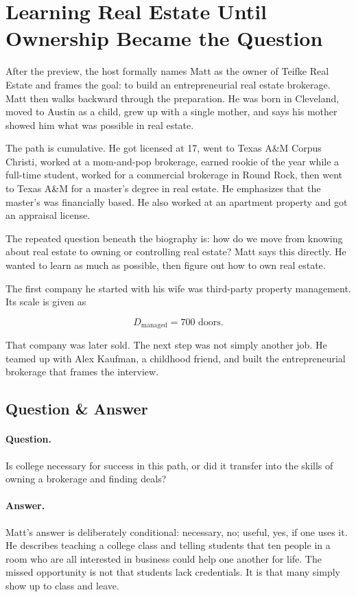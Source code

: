 \section{Learning Real Estate Until Ownership Became the Question}

After the preview, the host formally names Matt as the owner of Teifke Real Estate and frames the goal: to build an entrepreneurial real estate brokerage. Matt then walks backward through the preparation. He was born in Cleveland, moved to Austin as a child, grew up with a single mother, and says his mother showed him what was possible in real estate.

The path is cumulative. He got licensed at 17, went to Texas A\&M Corpus Christi, worked at a mom-and-pop brokerage, earned rookie of the year while a full-time student, worked for a commercial brokerage in Round Rock, then went to Texas A\&M for a master's degree in real estate. He emphasizes that the master's was financially based. He also worked at an apartment property and got an appraisal license.

The repeated question beneath the biography is: how do we move from knowing about real estate to owning or controlling real estate? Matt says this directly. He wanted to learn as much as possible, then figure out how to own real estate.

The first company he started with his wife was third-party property management. Its scale is given as

\begin{equation}
D_{\text{managed}}=700 \text{ doors}.
\end{equation}

That company was later sold. The next step was not simply another job. He teamed up with Alex Kaufman, a childhood friend, and built the entrepreneurial brokerage that frames the interview.

\subsection{Question \& Answer}

\paragraph{Question.}
Is college necessary for success in this path, or did it transfer into the skills of owning a brokerage and finding deals?

\paragraph{Answer.}
Matt's answer is deliberately conditional: necessary, no; useful, yes, if one uses it. He describes teaching a college class and telling students that ten people in a room who are all interested in business could help one another for life. The missed opportunity is not that students lack credentials. It is that many simply show up to class and leave.

